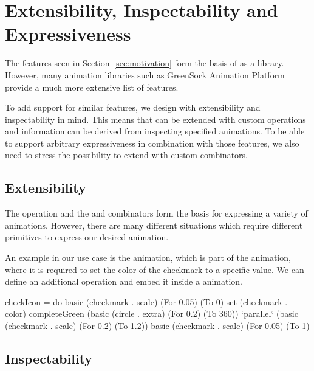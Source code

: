 \section{Extensibility, Inspectability and Expressiveness}
\label{sec:features}

The features seen in Section~\ref{sec:motivation} form the basis of \dsl{} as a library. However, many animation libraries such as GreenSock Animation Platform provide a much more extensive list of features.

To add support for similar features, we design \dsl{} with extensibility and inspectability in mind. This means that \dsl{} can be extended with custom operations and information can be derived from inspecting specified animations. To be able to support arbitrary expressiveness in combination with those features, we also need to stress the possibility to extend \dsl{} with custom combinators.

\subsection{Extensibility}
\label{sec:customop}

The  operation and the  and  combinators form the basis for expressing a variety of animations. However, there are many different situations which require different primitives to express our desired animation.

An example in our use case is the  animation, which is part of the  animation, where it is required to set the color of the checkmark to a specific value. We can define an additional  operation and embed it inside a \dsl{} animation.

\begin{spec}
checkIcon = do
  basic (checkmark . scale) (For 0.05) (To 0)
  set (checkmark . color) completeGreen
  (basic (circle . extra) (For 0.2) (To 360))
    `parallel`
    (basic (checkmark . scale) (For 0.2) (To 1.2))
  basic (checkmark . scale) (For 0.05) (To 1)
\end{spec}


\subsection{Inspectability}

